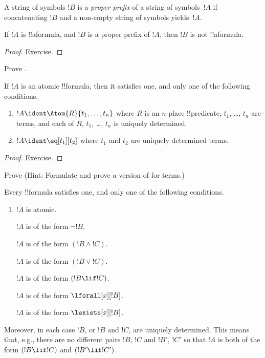 \begin{defn}
A string of symbols $!B$ is a \emph{proper prefix} of a string of symbols~$!A$ if
concatenating $!B$ and a non-empty string of symbols yields~$!A$.
\end{defn}

\begin{lem}
If $!A$ is !!a{formula}, and $!B$ is a proper prefix of $!A$, then
$!B$ is not !!a{formula}.
\end{lem}

\begin{proof}
Exercise.
\end{proof}

\begin{prob}
Prove .
\end{prob}

\begin{prop}
If $!A$ is an atomic !!{formula}, then it satisfies one, and only one
of the following conditions.
\begin{enumerate}
$!A \ident \lfalse$.

\item $!A \ident \Atom{R}{t_1,\dots,t_n}$ where $R$ is an $n$-place
  !!{predicate}, $t_1$, \dots, $t_n$ are terms, and each of $R$,
  $t_1$, \dots, $t_n$ is uniquely determined.
\item $!A \ident \eq[t_1][t_2]$ where $t_1$ and $t_2$ are uniquely
  determined terms.
\end{enumerate}
\end{prop}

\begin{proof}
Exercise.
\end{proof}

\begin{prob}
Prove  (Hint: Formulate and
prove a version of  for terms.)
\end{prob}

\begin{prop}
Every !!{formula} satisfies one, and only one of the following conditions.
\begin{enumerate}
\item $!A$ is atomic.

$!A$ is of the form $\lnot !B$.

$!A$ is of the form $(!B \land !C)$.

$!A$ is of the form $(!B \lor !C)$.

$!A$ is of the form $(!B \lif !C)$.



$!A$ is of the form $\lforall[x][!B]$.

$!A$ is of the form $\lexists[x][!B]$.
\end{enumerate}
Moreover, in each case $!B$, or $!B$ and $!C$, are uniquely
determined.  This means that, e.g., there are no different pairs $!B$,
$!C$ and $!B'$, $!C'$ so that $!A$ is both of the form 
$(!B \lif !C)$ and $(!B' \lif !C')$.
\end{prop}

